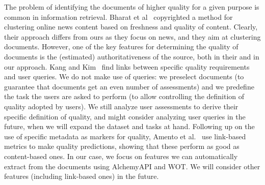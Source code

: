 \documentclass{llncs}
\begin{document}
The problem of identifying the documents of higher quality for a given purpose is common in information retrieval. Bharat et al~\cite{bharat2016method} copyrighted a method for clustering online news content based on freshness and quality of content. Clearly, their approach differs from ours as they focus on news, and they aim at clustering documents. However, one of the key features for determining the quality of documents is the (estimated) authoritativeness of the source, both in their and in our approach. Kang and Kim~\cite{Kang:2003:QTC:860435.860449} find links between specific quality requirements and user queries. We do not make use of queries: we preselect documents (to guarantee that documents get an even number of assessments) and we predefine the task the users are asked to perform (to allow controlling the definition of quality adopted by users). We still analyze user assessments to derive their specific definition of quality, and might consider analyzing user queries in the future, when we will expand the dataset and tasks at hand.
%
%
%
%
%
Following up on the use of specific metadata as markers for quality, Amento et al.~\cite{Amento:2000:LMQ:345508.345603} use link-based metrics to make quality predictions, showing that these perform as good as content-based ones. In our case, we focus on features we can automatically extract from the documents using AlchemyAPI and WOT. We will consider other features (including link-based ones) in the future. %
%
%
%
%
%
\end{document}
